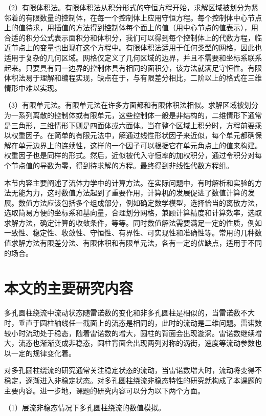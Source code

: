 （2）有限体积法。有限体积法从积分形式的守恒方程开始，求解区域被划分为紧邻着的有限数量的控制体，在每一个控制体上应用守恒方程。每个控制体中心节点上的值待求，用插值的方法得到控制体每个面上的值（用中心节点的值表示），用合适的积分公式表示面积分和体积分，我们可以得到每个控制体上的代数方程，临近节点上的变量也出现在这个方程中。有限体积法适用于任何类型的网格，因此也适用于复杂的几何区域。网格仅定义了几何区域的边界，并且不需要和坐标系联系起来。只要具有同一边界的控制体具有相同的面积分，该方法就满足守恒性。有限体积法易于理解和编程实现，缺点在于，与有限差分相比，二阶以上的格式在三维情形中难以实现。

（3）有限单元法。有限单元法在许多方面都和有限体积法相似。求解区域被划分为一系列离散的控制体或有限单元，这些控制体一般是非结构的，二维情形下通常是三角形，三维情形下则是四面体或六面体。当在整个区域上积分时，方程前要乘以权重因子。在简单的有限元法中，解通过线性形状因子来近似，每个单元都确保解在单元边界上的连续性，这样的一个因子可以根据它在单元角点上的值来构建。权重因子也是同样的形式。然后，近似被代入守恒率的加权积分，通过令积分对每个节点值的导数为零，得到待求解的方程。最终得到非线性代数方程组。%

本节内容主要阐述了流体力学中的计算方法。在实际问题中，有时解析和实验的方法无能为力，这时数值方法起到了重要作用，计算机的发展促进了数值计算的发展。数值方法应该包括多个组成部分，例如确定数学模型，选择恰当的离散方法，选取简易方便的坐标系和基向量，合理划分网格，兼顾计算精度和计算效率，选取求解方法，确定计算的收敛条件，等等。同时数值解法需要满足一定的性质，例如一致性、稳定性、收敛性、守恒性、有界性、可实现性和准确性等。常用的几种数值求解方法有限差分法、有限体积和有限单元法，各有一定的优缺点，适用于不同的场合。

\section{本文的主要研究内容}

多孔圆柱绕流中流动状态随雷诺数的变化和非多孔圆柱是相似的，当雷诺数不大时，垂直于圆柱轴线任一截面上的流态是相同的，此时的流动是二维问题。雷诺数较小时流动处于稳态，随着雷诺数的增大，圆柱的背面会出现漩涡。雷诺数继续增大，流态也渐渐变成非稳态，圆柱背面会出现两列对称的涡街，速度等流动参数也以一定的规律变化着。

对多孔圆柱绕流的研究通常关注稳定状态的流动，当雷诺数增大时，流动将变得不稳定，逐渐进入非稳定状态。对多孔圆柱绕流非稳态特性的研究就构成了本课题的主要内容。进一步地，课题的研究内容可以分为以下两个方面。

（1）层流非稳态情况下多孔圆柱绕流的数值模拟。

